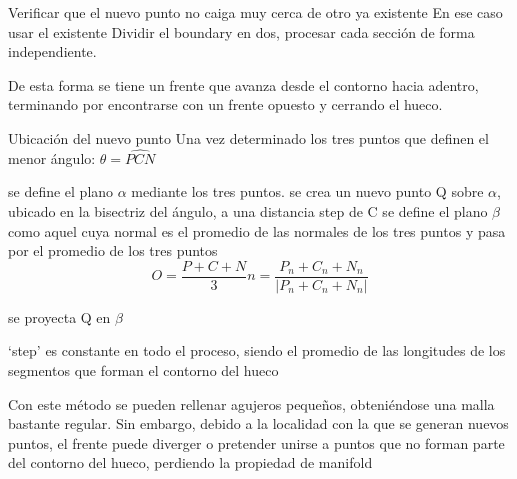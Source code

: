 		Verificar que el nuevo punto no caiga muy cerca de otro ya existente
		En ese caso usar el existente
			Dividir el boundary en dos, procesar cada sección de forma independiente.

		De esta forma se tiene un frente que avanza desde el contorno hacia adentro, terminando por encontrarse con un frente opuesto y cerrando el hueco.


	Ubicación del nuevo punto
		Una vez determinado los tres puntos que definen el menor ángulo: 
			$\theta = \widehat{PCN}$

		se define el plano $\alpha$ mediante los tres puntos.
		se crea un nuevo punto Q sobre $\alpha$, ubicado en la bisectriz del ángulo, a una distancia step de C
		se define el plano $\beta$ como aquel cuya normal es el promedio de las normales de los tres puntos y pasa por el promedio de los tres puntos
		\[
		O = \frac{P+C+N}{3}
		n = \frac{P_n + C_n + N_n} {|P_n + C_n + N_n|}
		\]

		se proyecta Q en $\beta$

		`step' es constante en todo el proceso, siendo el promedio de las longitudes de los segmentos que forman el contorno del hueco


		Con este método se pueden rellenar agujeros pequeños, obteniéndose una malla bastante regular.
		Sin embargo, debido a la localidad con la que se generan nuevos puntos, el frente puede diverger o pretender unirse a puntos que no forman parte del contorno del hueco, perdiendo la propiedad de manifold
